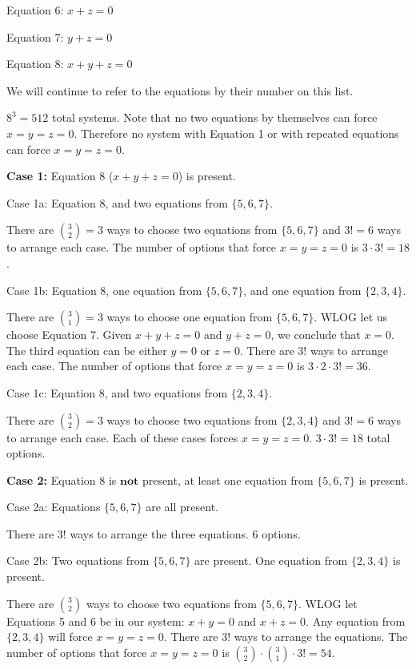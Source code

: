 \begin{enumerate}
 Equation 6: $x + z = 0$

 Equation 7: $y + z = 0$

 Equation 8: $x + y + z = 0$

 We will continue to refer to the equations by their number on this list.

 $8^3 = 512$ total systems. Note that no two equations by themselves can force $x = y = z = 0$. Therefore no system with Equation 1 or with repeated equations can force $x = y = z = 0$.

 \textbf{Case 1:} Equation 8 ($x + y + z = 0$) is present.

 Case 1a: Equation 8, and two equations from $\{5, 6, 7\}$.

 There are $\binom{3}{2} = 3$ ways to choose two equations from $\{5, 6, 7\}$ and $3! = 6$ ways to arrange each case. The number of options that force $x = y = z = 0$ is $3 \cdot 3! = 18$.

 Case 1b: Equation 8, one equation from $\{5, 6, 7\}$, and one equation from $\{2, 3, 4\}$.

 There are $\binom{3}{1} = 3$ ways to choose one equation from $\{5, 6, 7\}$. WLOG let us choose Equation 7. Given $x + y + z = 0$ and $y + z = 0$, we conclude that $x = 0$. The third equation can be either $y = 0$ or $z = 0$. There are $3!$ ways to arrange each case. The number of options that force $x = y = z = 0$ is $3 \cdot 2 \cdot 3! = 36$.

 Case 1c: Equation 8, and two equations from $\{2, 3, 4\}$.

 There are $\binom{3}{2} = 3$ ways to choose two equations from $\{2, 3, 4\}$ and $3! = 6$ ways to arrange each case. Each of these cases forces $x = y = z = 0$. $3 \cdot 3! = 18$ total options.

 \textbf{Case 2:} Equation 8 is $\textbf{not}$ present, at least one equation from $\{5, 6, 7\}$ is present.

 Case 2a: Equations $\{5, 6, 7\}$ are all present.

 There are $3!$ ways to arrange the three equations. $6$ options.

 Case 2b: Two equations from $\{5, 6, 7\}$ are present. One equation from $\{2, 3, 4\}$ is present.

 There are $\binom{3}{2}$ ways to choose two equations from $\{5, 6, 7\}$. WLOG let Equations 5 and 6 be in our system: $x + y = 0$ and $x + z = 0$. Any equation from $\{2, 3, 4\}$ will force $x = y = z = 0$. There are $3!$ ways to arrange the equations. The number of options that force $x = y = z = 0$ is $\binom{3}{2} \cdot \binom{3}{1} \cdot 3! = 54$.


\end{enumerate}
